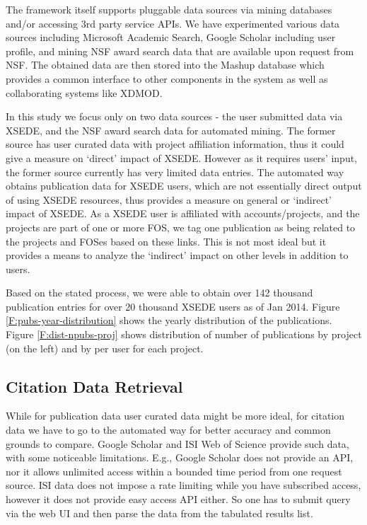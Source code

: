 The framework itself supports pluggable data sources via mining databases and/or accessing 3rd party service APIs. We have experimented various data sources including Microsoft Academic Search, Google Scholar including user profile, and mining NSF award search data that are available upon request from NSF. The obtained data are then stored into the Mashup database which provides a common interface to other components in the system as well as collaborating systems like XDMOD.

In this study we focus only on two data sources - the user submitted data via XSEDE, and the NSF award search data for automated mining. The former source has user curated data with project affiliation information, thus it could give a measure on `direct' impact of XSEDE. However as it requires users' input, the former source currently has very limited data entries. The automated way obtains publication data for XSEDE users, which are not essentially direct output of using XSEDE resources, thus provides a measure on general or `indirect' impact of XSEDE. As a XSEDE user is affiliated with accounts/projects, and the projects are part of one or more FOS, we tag one publication as being related to the projects and FOSes based on these links. This is not most ideal but it provides a means to analyze the `indirect' impact on other levels in addition to users.

Based on the stated process, we were able to obtain over 142 thousand publication entries for over 20 thousand XSEDE users as of Jan 2014. Figure \ref{F:pubs-year-distribution} shows the yearly distribution of the publications. Figure \ref{F:dist-npubs-proj} shows distribution of number of publications by project (on the left) and by per user for each project.

\subsection{Citation Data Retrieval}

While for publication data user curated data might be more ideal, for citation data we have to go to the automated way for better accuracy and common grounds to compare. Google Scholar and ISI Web of Science provide such data, with some noticeable limitations. E.g., Google Scholar does not provide an API, nor it allows unlimited access within a bounded time period from one request source. ISI data does not impose a rate limiting while you have subscribed access, however it does not provide easy access API either. So one has to submit query via the web UI and then parse the data from the tabulated results list.

